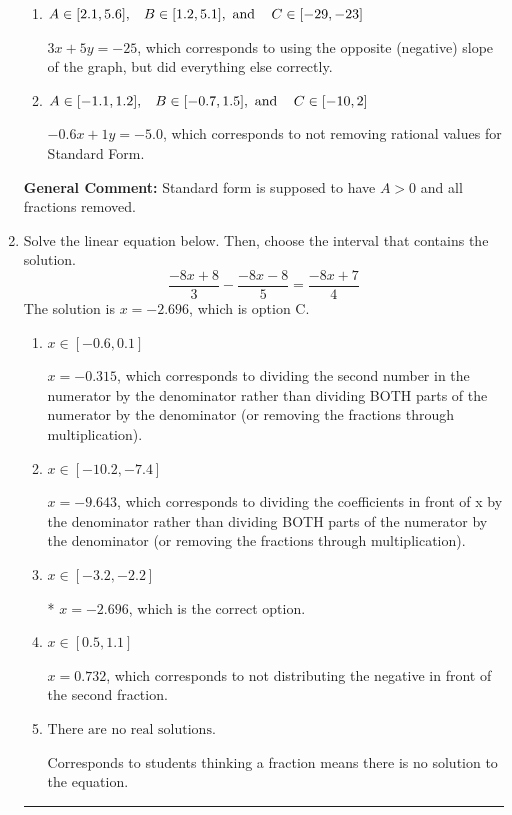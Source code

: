 \documentclass{extbook}[14pt]
\newcommand{\litem}[1]{\item #1

\rule{\textwidth}{0.4pt}}
\begin{document}
\begin{enumerate}
{\begin{enumerate}[label=\Alph*.]
* $3x - 5y = 25$, which is the correct option.
\item \( A \in [2.1, 5.6], \hspace{3mm} B \in [1.2, 5.1], \text{ and } \hspace{3mm} C \in [-29, -23] \)

 $3x + 5y = -25$, which corresponds to using the opposite (negative) slope of the graph, but did everything else correctly.
\item \( A \in [-1.1, 1.2], \hspace{3mm} B \in [-0.7, 1.5], \text{ and } \hspace{3mm} C \in [-10, 2] \)

 $-0.6x + 1y = -5.0$, which corresponds to not removing rational values for Standard Form.
\end{enumerate}

\textbf{General Comment:} Standard form is supposed to have $A > 0$ and all fractions removed.
}
\litem{
Solve the linear equation below. Then, choose the interval that contains the solution.
\[ \frac{-8x + 8}{3} - \frac{-8x -8}{5} = \frac{-8x + 7}{4} \]The solution is \( x = -2.696 \), which is option C.\begin{enumerate}[label=\Alph*.]
\item \( x \in [-0.6, 0.1] \)

 $x = -0.315$, which corresponds to dividing the second number in the numerator by the denominator rather than dividing BOTH parts of the numerator by the denominator (or removing the fractions through multiplication).
\item \( x \in [-10.2, -7.4] \)

 $x = -9.643$, which corresponds to dividing the coefficients in front of x by the denominator rather than dividing BOTH parts of the numerator by the denominator (or removing the fractions through multiplication).
\item \( x \in [-3.2, -2.2] \)

* $x = -2.696$, which is the correct option.
\item \( x \in [0.5, 1.1] \)

 $x = 0.732$, which corresponds to not distributing the negative in front of the second fraction.
\item \( \text{There are no real solutions.} \)

Corresponds to students thinking a fraction means there is no solution to the equation.
\end{enumerate}

}
\end{enumerate}
\end{document}
